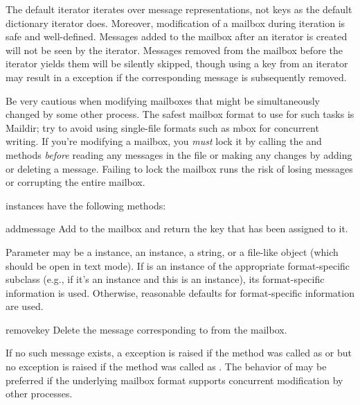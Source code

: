 The default  iterator iterates over message representations, not
keys as the default dictionary iterator does. Moreover, modification of a
mailbox during iteration is safe and well-defined. Messages added to the
mailbox after an iterator is created will not be seen by the iterator. Messages
removed from the mailbox before the iterator yields them will be silently
skipped, though using a key from an iterator may result in a
 exception if the corresponding message is subsequently
removed.

\begin{notice}[warning]
Be very cautious when modifying mailboxes that might be
simultaneously changed by some other process.  The safest mailbox
format to use for such tasks is Maildir; try to avoid using
single-file formats such as mbox for concurrent writing.  If you're
modifying a mailbox, you
\emph{must} lock it by calling the  and
 methods \emph{before} reading any messages in the file
or making any changes by adding or deleting a message.  Failing to
lock the mailbox runs the risk of losing messages or corrupting the entire
mailbox.
\end{notice}

 instances have the following methods:

\begin{methoddesc}{add}{message}
Add  to the mailbox and return the key that has been assigned to
it.

Parameter  may be a  instance, an
 instance, a string, or a file-like object (which
should be open in text mode). If  is an instance of the
appropriate format-specific  subclass (e.g., if it's an
 instance and this is an  instance), its
format-specific information is used. Otherwise, reasonable defaults for
format-specific information are used.
\end{methoddesc}

\begin{methoddesc}{remove}{key}
Delete the message corresponding to  from the mailbox.

If no such message exists, a  exception is raised if the
method was called as  or  but no
exception is raised if the method was called as . The
behavior of  may be preferred if the underlying mailbox
format supports concurrent modification by other processes.
\end{methoddesc}

